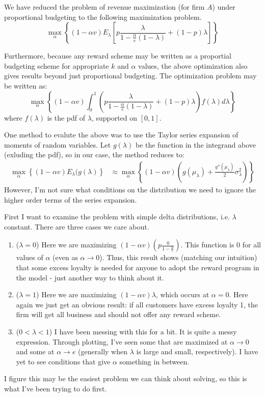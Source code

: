 \documentclass{article}
\begin{document}
We have reduced the problem of revenue maximization (for firm $A$) under proportional budgeting to the following maximization problem.
\begin{equation}
\max_{\alpha} \left\{(1-\alpha v)E_{\lambda} \left[p \frac{\lambda}{1-\frac{\alpha}{e}(1-\lambda)}+(1-p)\lambda\right] \right\}
\end{equation}

Furthermore, because any reward scheme may be written as a proportial budgeting scheme for appropriate $k$ and $\alpha$ values, the above optimization also gives results beyond just proportional budgeting. The optimization problem may be written as:
\begin{equation}
\max_{\alpha} \left\{(1-\alpha v) \int_0^1 \left(p \frac{\lambda}{1-\frac{\alpha}{e}(1-\lambda)}+(1-p)\lambda \right) f(\lambda) d\lambda  \right\}
\end{equation}
where $f(\lambda)$ is the pdf of $\lambda$, supported on $[0,1]$.

One method to evalute the above was to use the Taylor series expansion of moments of random variables. Let $g(\lambda)$ be the function in the integrand above (exluding the pdf), so in our case, the method reduces to:
\begin{align*}
\max_{\alpha} \left\{(1-\alpha v) E_{\lambda} (g(\lambda) \right\} &\approx \max_{\alpha} \left\{(1-\alpha v) \left(g(\mu_{\lambda})+\frac{g''(\mu_\lambda)}{2} \sigma_{\lambda}^2 \right) \right\}
\end{align*}
However, I'm not sure what conditions on the distribution we need to ignore the higher order terms of the series expansion.

First I want to examine the problem with simple delta distributions, i.e. $\lambda$ constant. There are three cases we care about.

\begin{enumerate}
\item ($\lambda = 0$) Here we are maximizing $(1-\alpha v)\left(p \frac{0}{1-\frac{\alpha}{e}} \right)$. This function is 0 for all values of $\alpha$ (even as $\alpha \rightarrow 0$). Thus, this result shows (matching our intuition) that some excess loyalty is needed for anyone to adopt the reward program in the model - just another way to think about it.

\item ($\lambda = 1$) Here we are maximizing $(1-\alpha v) \lambda$, which occurs at $\alpha = 0$. Here again we just get an obvious result: if all customers have excess loyalty 1, the firm will get all business and should not offer any reward scheme.

\item ($0 < \lambda < 1$) I have been messing with this for a bit. It is quite a messy expression. Through plotting, I've seen some that are maximized at $\alpha \rightarrow 0$ and some at $\alpha \rightarrow e$ (generally when $\lambda$ is large and small, respectively). I have yet to see conditions that give $\alpha$ something in between. 
\end{enumerate}

I figure this may be the easiest problem we can think about solving, so this is what I've been trying to do first.
\end{document}
